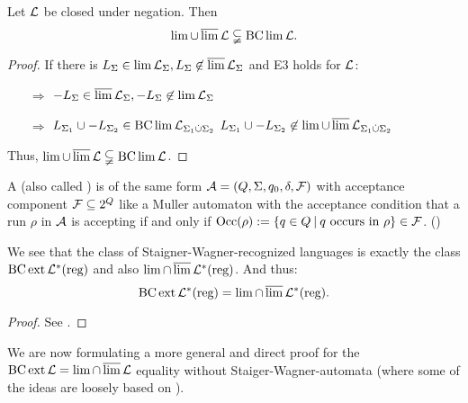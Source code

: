 \begin{lemma}
Let $\mathcal{L}$ be closed under negation. Then
\[ \lim \cup \operatorname{\overline{lim}} \mathcal{L} \subsetneqq \operatorname{BC} \lim \mathcal{L} . \]
\begin{proof}
If there is $L_\Sigma \in \lim \mathcal{L}_\Sigma, L_\Sigma \not\in \operatorname{\overline{lim}} \mathcal{L}_\Sigma$ and E3 holds for $\mathcal{L}$:
\begin{itemize}
\item[$\Rightarrow$] $-L_\Sigma \in \operatorname{\overline{lim}} \mathcal{L}_\Sigma, -L_\Sigma \not\in \lim \mathcal{L}_\Sigma$
\item[$\Rightarrow$] $L_{\Sigma_1} \cup -L_{\Sigma_2} \in \operatorname{BC} \lim \mathcal{L}_{\Sigma_1 \dot{\cup} \Sigma_2}$ \newline
$L_{\Sigma_1} \cup -L_{\Sigma_2} \not\in \lim \cup \operatorname{\overline{lim}} \mathcal{L}_{\Sigma_1 \dot{\cup} \Sigma_2}$
\end{itemize}
Thus, $ \lim \cup \operatorname{\overline{lim}} \mathcal{L} \subsetneqq \operatorname{BC} \lim \mathcal{L} $.
\end{proof}
\end{lemma}

\begin{mydef}
\label{def:staiger-wagner}
A  (also called ) is of the same form $\mathcal{A} = (Q,\Sigma,q_0,\delta,\mathcal{F})$ with acceptance component $\mathcal{F} \subseteq 2^Q$ like a Muller automaton with the acceptance condition that a run $\rho$ in $\mathcal{A}$ is accepting if and only if $\Occ(\rho) := \Set{q \in Q}{\text{$q$ occurs in $\rho$}} \in \F$.  (\cite[Def.61, p.43]{InfCompR101})
\end{mydef}

\begin{theorem}
\label{thm:staiger-wagner}
We see that the class of Staigner-Wagner-recognized languages is exactly the class $\operatorname{BC} \operatorname{ext} \mathcal{L}^*(\text{reg})$ and also $\lim \cap \operatorname{\overline{lim}} \mathcal{L}^*(\text{reg})$. And thus:
\[ \operatorname{BC} \operatorname{ext} \mathcal{L}^*(\text{reg}) = \lim \cap \operatorname{\overline{lim}} \mathcal{L}^*(\text{reg}) . \]
\begin{proof}
See \cite[Theorem 63+64, p.44]{InfCompR101}.
\end{proof}
\end{theorem}

We are now formulating a more general and direct proof for the $\operatorname{BC} \operatorname{ext} \mathcal{L} = \lim \cap \operatorname{\overline{lim}} \mathcal{L}$ equality without Staiger-Wagner-automata (where some of the ideas are loosely based on \cite[Theorem 63+64, p.44]{InfCompR101}).

